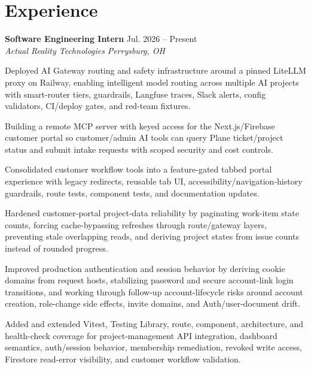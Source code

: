 \documentclass[letterpaper,10pt]{article}
\newcommand{\resumeSubheading}[4]{
  \vspace{2pt}
  \textbf{#1} \hfill #2\\
  \textit{#3} \hfill \textit{#4}
}
\begin{document}
\section{Experience}
\resumeSubheading
{Software Engineering Intern}{Jul. 2026 -- Present}
{Actual Reality Technologies}{Perrysburg, OH}
\begin{tightitemize}
  \item Deployed AI Gateway routing and safety infrastructure around a pinned LiteLLM proxy on Railway, enabling intelligent model routing across multiple AI projects with smart-router tiers, guardrails, Langfuse traces, Slack alerts, config validators, CI/deploy gates, and red-team fixtures.
  \item Building a remote MCP server with keyed access for the Next.js/Firebase customer portal so customer/admin AI tools can query Plane ticket/project status and submit intake requests with scoped security and cost controls.
  \item Consolidated customer workflow tools into a feature-gated tabbed portal experience with legacy redirects, reusable tab UI, accessibility/navigation-history guardrails, route tests, component tests, and documentation updates.
  \item Hardened customer-portal project-data reliability by paginating work-item state counts, forcing cache-bypassing refreshes through route/gateway layers, preventing stale overlapping reads, and deriving project states from issue counts instead of rounded progress.
  \item Improved production authentication and session behavior by deriving cookie domains from request hosts, stabilizing password and secure account-link login transitions, and working through follow-up account-lifecycle risks around account creation, role-change side effects, invite domains, and Auth/user-document drift.
  \item Added and extended Vitest, Testing Library, route, component, architecture, and health-check coverage for project-management API integration, dashboard semantics, auth/session behavior, membership remediation, revoked write access, Firestore read-error visibility, and customer workflow validation.
\end{tightitemize}
\end{document}

